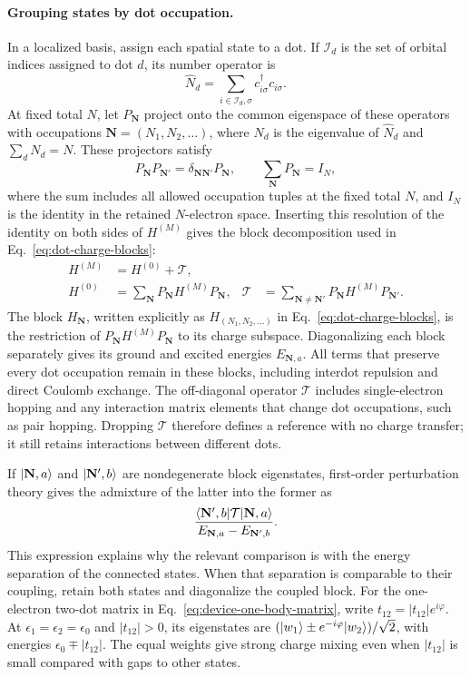 \paragraph{Grouping states by dot occupation.}
In a localized basis, assign each spatial state to a dot. If
$\mathcal I_d$ is the set of orbital indices assigned to dot $d$,
its number operator is
\[
 \hat N_d=\sum_{i\in\mathcal I_d,\sigma}
                 c_{i\sigma}^{\dagger}c_{i\sigma}.
\]
At fixed total $N$, let $P_{\mathbf N}$ project onto the common
eigenspace of these operators with occupations
$\mathbf N=(N_1,N_2,\ldots)$, where $N_d$ is the eigenvalue of
$\hat N_d$ and $\sum_d N_d=N$. These projectors satisfy
\begin{equation}
 P_{\mathbf N}P_{\mathbf N'}
   =\delta_{\mathbf N\mathbf N'}P_{\mathbf N},
 \qquad
 \sum_{\mathbf N}P_{\mathbf N}=I_N,
 \label{eq:device-charge-projectors}
\end{equation}
where the sum includes all allowed occupation tuples at the fixed
total $N$, and $I_N$ is the identity in the retained $N$-electron space.
Inserting this resolution of the identity on both sides of
$H^{(M)}$ gives the block decomposition used in
Eq.~\eqref{eq:dot-charge-blocks}:
\begin{equation}
 \begin{aligned}
 H^{(M)}&=H^{(0)}+\mathcal T,\\
 H^{(0)}&=\sum_{\mathbf N}P_{\mathbf N}H^{(M)}P_{\mathbf N},
 &\mathcal T&=\sum_{\mathbf N\ne\mathbf N'}
            P_{\mathbf N}H^{(M)}P_{\mathbf N'}.
 \end{aligned}
 \label{eq:device-charge-blocks}
\end{equation}
The block $H_{\mathbf N}$, written explicitly as
$H_{(N_1,N_2,\ldots)}$ in Eq.~\eqref{eq:dot-charge-blocks}, is the restriction of
$P_{\mathbf N}H^{(M)}P_{\mathbf N}$ to its charge subspace.
Diagonalizing each block separately gives its ground and excited
energies $E_{\mathbf N,a}$. All terms that preserve every dot
occupation remain in these blocks, including interdot repulsion
and direct Coulomb exchange. The off-diagonal operator $\mathcal T$
includes single-electron hopping and any interaction matrix elements
that change dot occupations, such as pair hopping. Dropping
$\mathcal T$ therefore defines a reference with no charge transfer;
it still retains interactions between different dots.

If $\lvert \mathbf N,a\rangle$ and $\lvert \mathbf N',b\rangle$ are nondegenerate
block eigenstates, first-order perturbation theory gives the
admixture of the latter into the former as
\[
 \frac{\langle \mathbf N',b\rvert\mathcal T\lvert \mathbf N,a\rangle}
      {E_{\mathbf N,a}-E_{\mathbf N',b}}.
\]
This expression explains why the relevant comparison is with the
energy separation of the connected states. When that separation
is comparable to their coupling, retain both states and diagonalize
the coupled block. For the one-electron two-dot matrix in
Eq.~\eqref{eq:device-one-body-matrix}, write
$t_{12}=|t_{12}|e^{i\varphi}$. At $\epsilon_1=\epsilon_2=\epsilon_0$
and $|t_{12}|>0$, its eigenstates are
$(\lvert w_1\rangle\pm e^{-i\varphi}\lvert w_2\rangle)/\sqrt2$, with energies
$\epsilon_0\mp|t_{12}|$. The equal weights give strong charge
mixing even when $|t_{12}|$ is small compared with gaps to other
states.

